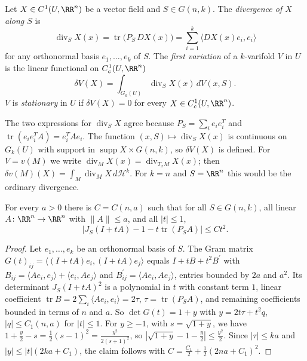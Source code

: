 \begin{definition}\label{varifolds:definition-first-variation}
Let $X \in C^1(U, \RR^n)$ be a vector field and $S \in G(n, k)$. The \emph{divergence of $X$ along $S$} is
\[
\operatorname{div}_SX(x) = \operatorname{tr}\bigl(P_S\,DX(x)\bigr) = \sum_{i=1}^k\langle DX(x)e_i, e_i\rangle
\]
for any orthonormal basis $e_1, \ldots, e_k$ of $S$. The \emph{first variation} of a $k$-varifold $V$ in $U$ is the linear functional on $C^1_c(U, \RR^n)$
\[
\delta V(X) = \int_{G_k(U)}\operatorname{div}_SX(x)\,dV(x, S) .
\]
$V$ is \emph{stationary} in $U$ if $\delta V(X) = 0$ for every $X \in C^1_c(U, \RR^n)$.
\end{definition}

The two expressions for $\operatorname{div}_SX$ agree because $P_S = \sum_ie_ie_i^T$ and $\operatorname{tr}(e_ie_i^TA) = e_i^TAe_i$. The function $(x, S) \mapsto \operatorname{div}_SX(x)$ is continuous on
$G_k(U)$ with support in $\operatorname{supp}X \times G(n, k)$, so $\delta V(X)$ is defined. For $V = v(M)$ we write $\operatorname{div}_MX(x) = \operatorname{div}_{T_xM}X(x)$; then
$\delta v(M)(X) = \int_M\operatorname{div}_MX\,d\mathcal{H}^k$. For $k = n$ and $S = \RR^n$ this would be the ordinary divergence.

\begin{lemma}\label{varifolds:lemma-jacobian-expansion}
For every $a > 0$ there is $C = C(n, a)$ such that for all $S \in G(n, k)$, all linear $A \colon \RR^n \to \RR^n$ with $\|A\| \leq a$, and all $|t| \leq 1$,
\[
\bigl|J_S(I + tA) - 1 - t\operatorname{tr}(P_SA)\bigr| \leq Ct^2 .
\]
\end{lemma}

\begin{proof}
Let $e_1, \ldots, e_k$ be an orthonormal basis of $S$. The Gram matrix $G(t)_{ij} = \langle(I + tA)e_i, (I + tA)e_j\rangle$ equals $I + tB + t^2B^{\prime}$ with
$B_{ij} = \langle Ae_i, e_j\rangle + \langle e_i, Ae_j\rangle$ and $B^{\prime}_{ij} = \langle Ae_i, Ae_j\rangle$, entries bounded by $2a$ and $a^2$. Its determinant $J_S(I + tA)^2$ is a polynomial in $t$ with constant
term $1$, linear coefficient $\operatorname{tr}B = 2\sum_i\langle Ae_i, e_i\rangle = 2\tau$, $\tau = \operatorname{tr}(P_SA)$, and remaining coefficients bounded in terms of $n$ and $a$. So
$\det G(t) = 1 + y$ with $y = 2t\tau + t^2q$, $|q| \leq C_1(n, a)$ for $|t| \leq 1$. For $y \geq -1$, with $s = \sqrt{1 + y}$, we have $1 + \frac y2 - s = \frac12(s - 1)^2 = \frac{y^2}{2(s + 1)^2}$, so
$|\sqrt{1 + y} - 1 - \frac y2| \leq \frac{y^2}2$. Since $|\tau| \leq ka$ and $|y| \leq |t|(2ka + C_1)$, the claim follows with $C = \frac{C_1}2 + \frac12(2na + C_1)^2$.
\end{proof}

